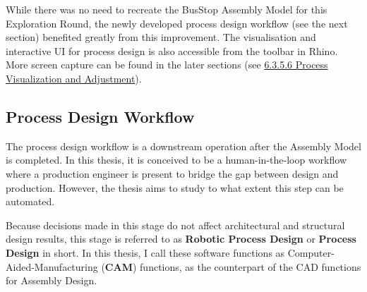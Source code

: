 

While there was no need to recreate the BusStop Assembly Model for this Exploration Round, the newly developed process design workflow (see the next section) benefited greatly from this improvement. The visualisation and interactive UI for process design is also accessible from the toolbar in Rhino. More screen capture can be found in the later sections (see \ul{6.3.5.6 Process Visualization and Adjustment}).

\subsection{Process Design Workflow}
\label{subsection:exploration_3_process_design_workflow}

The process design workflow is a downstream operation after the Assembly Model is completed. In this thesis, it is conceived to be a human-in-the-loop workflow where a production engineer is present to bridge the gap between design and production. However, the thesis aims to study to what extent this step can be automated.

Because decisions made in this stage do not affect architectural and structural design results, this stage is referred to as\textbf{ Robotic Process Design} or \textbf{Process Design }in short. In this thesis, I call these software functions as Computer-Aided-Manufacturing (\textbf{CAM}) functions, as the counterpart of the CAD functions for Assembly Design.

